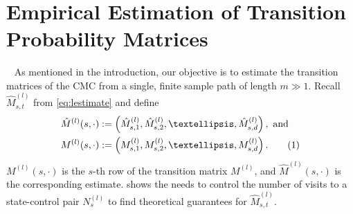\documentclass[opre,sglanonrev]{informs4}
\numberwithin{equation}{section}
\newcommand{\pow}[1]{^{(#1)}}
\newcommand{\lc}{\left\{}
\newcommand{\rc}{\right\}}
\newcommand{\Ibb}{\mathbb{I}}
\newcommand{\alphabets}{\{a_0,a_1,\dots\}}
\newcommand{\hatmls}{\Hat{M}^{(l)}(s,\cdot)}
\newcommand{\mls}{{M}^{(l)}(s,\cdot)}
\newcommand\numberthis{\addtocounter{equation}{1}\tag{\theequation}}
\newcommand{\indicator}{\vmathbb{1}}
\begin{document}
{\section{Empirical Estimation of Transition Probability Matrices}~\label{sec:setup}
{ As mentioned in the introduction, our objective is to estimate the transition matrices of the CMC from a single, finite sample path of length $m \gg 1$. Recall $\hat M_{s,t}\pow l$ from \cref{eq:lestimate} and define
\begin{align*}
&\hatmls:=\left(\Hat{M}_{s,1}^{(l)},\Hat{M}_{s,2}^{(l)},\dots,\Hat{M}_{s,d}^{(l)} \right), \text{ and }\\
&\mls:=\left({M}_{s,1}^{(l)},{M}_{s,2}^{(l)},\dots,{M}_{s,d}^{(l)}\right).\numberthis\label{eq:proofsketch-eq1prime}    
\end{align*}
$M\pow l(s,\cdot)$ is the $s$-th row of the transition matrix $M\pow l$, and $\hat M\pow l (s,\cdot)$ is the corresponding estimate. }
{\noindent
{} shows the needs to control the number of visits to a state-control pair $N_s^{(l)}$ to find theoretical guarantees for $\hat M_{s,t}\pow{l}$.  }
{
\begin{proposition}~\label{prop:err-bnd}

\end{proposition}}}
\end{document}
